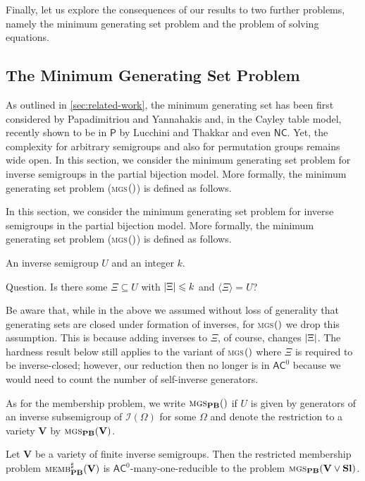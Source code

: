 \documentclass[anonymous,letter,UKenglish,cleveref,autoref,thm-restate]{lipics-v2021}
\makeatletter
\renewcommand{\leq}{\leqslant}
\newcommand{\sse}{\subseteq}
\newcommand{\abs}[1] {\ensuremath\left|#1\right|}
\newcommand{\gen}[1]{\langle #1 \rangle}
\newcommand{\Ptime}{\ensuremath{\mathsf{P}}\xspace}
\newcommand{\ACz}{\ensuremath{\mathsf{AC}^0}\xspace}
\newcommand{\NC}{\ensuremath{\mathsf{NC}}\xspace}
\newcommand{\vV}{\ensuremath{\mathbf{V}}}
\newcommand{\vSl}{\ensuremath{\mathbf{Sl}}}
\newcommand{\ISym}{\cI}
\newcommand{\cI}{\mathcal{I}}
\theoremstyle{plain}
\theoremstyle{plain}
\providecommand\iitem{}
\providecommand\qitem{}
\newcommand\decproblem@iitem@label{\rlap{Input.}\phantom{Question.}}
\newcommand\decproblem@qitem@label{Question.}
\newenvironment{decproblem}{\begin{description}\begin{samepage}\renewcommand{\iitem}{\item[\decproblem@iitem@label]}\renewcommand{\qitem}{\item[\decproblem@qitem@label]}}{\end{samepage}\end{description}}
\newcommand{\dMembS}[2][]{\textup{\textsc{memb${}^{\sharp}_{\mathbf{#1}}\expandafter\ifx\expandafter\relax\detokenize{#2}\relax\else(#2)\fi$}}}
\newcommand{\dMGS}[2][]{\textup{\textsc{mgs${}_{\mathbf{#1}}\expandafter\ifx\expandafter\relax\detokenize{#2}\relax\else(#2)\fi$}}}
\makeatother
\begin{document}
Finally, let us explore the consequences of our results to two further problems, namely the minimum generating set problem and the problem of solving equations.

\subsection{The Minimum Generating Set Problem}

As outlined in \cref{sec:related-work}, the minimum generating set has been first considered by Papadimitriou and Yannahakis \cite{PapadimitriouY96} and, in the Cayley table model, recently shown to be in \Ptime by Lucchini and Thakkar \cite{LucchiniT24} and even \NC \cite{CollinsGLW24}.
Yet, the complexity for arbitrary semigroups and also for permutation groups remains wide open.
In this section, we consider the minimum generating set problem for inverse semigroups in the partial bijection model. More formally, the minimum generating set problem (\dMGS{}) is defined as follows.

In this section, we consider the minimum generating set problem for inverse semigroups in the partial bijection model. More formally, the minimum generating set problem (\dMGS{}) is defined as follows.

\begin{decproblem}
	\iitem An inverse semigroup $U$ and an integer $k$.
	\qitem Is there some $\Xi \sse U$ with $\abs{\Xi} \leq k$ and $\gen{\Xi} = U$?
\end{decproblem}

Be aware that, while in the above we assumed without loss of generality that generating sets are closed under formation of inverses, for \dMGS{} we drop this assumption.
This is because adding inverses to $\Xi$, of course, changes $\abs{\Xi}$.
The hardness result below still applies to the variant of \dMGS{} where $\Xi$ is required to be inverse-closed; however, our reduction then no longer is in \ACz because we would need to count the number of self-inverse generators.

As for the membership problem, we write $\dMGS[PB]{}$ if $U$ is given by generators of an inverse subsemigroup of $\ISym(\Omega)$ for some $\Omega$ and denote the restriction to a variety $\vV$ by $\dMGS[PB]{\vV}$.



\begin{lemma}\label{lem:mgs-reduction}
	Let $\vV$ be a variety of finite inverse semigroups.
  Then the restricted membership problem $\dMembS[PB]{\vV}$ is \ACz-many-one-reducible to the problem $\dMGS[PB]{\vV \vee \vSl}$.
\end{lemma}
\end{document}
